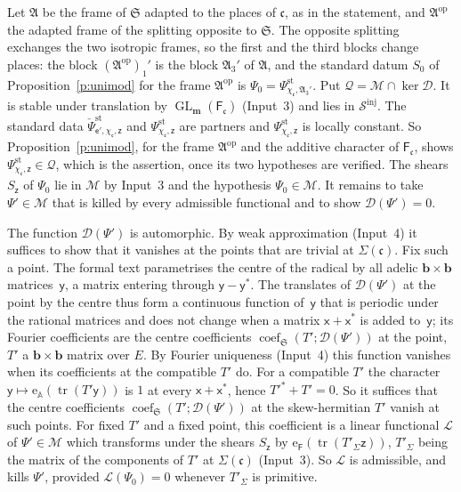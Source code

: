 \documentclass[11pt,a4paper]{article}
\makeatletter
\theoremstyle{plainx}
\theoremstyle{uprightx}
\renewenvironment{proof}[1][Proof]{\par\pushQED{\qed}\normalfont\topsep0pt\partopsep0pt
  \trivlist\item[\hskip\labelsep\itshape #1.]\ignorespaces}{\popQED\endtrivlist\@endpefalse}
\newcommand{\dL}{\check{\Psi}}         %
\newcommand{\dS}{\Psi}                 %
\newcommand{\sF}{\mathsf{F}}
\newcommand{\bb}{\mathbf{b}}
\newcommand{\bm}{\mathbf{m}}
\newcommand{\se}{\mathsf{e}}
\newcommand{\sx}{\mathsf{x}}
\newcommand{\sy}{\mathsf{y}}
\newcommand{\sz}{\mathsf{z}}
\newcommand{\fc}{\mathfrak{c}}
\newcommand{\fS}{\mathfrak{S}}
\newcommand{\fA}{\mathfrak{A}}
\newcommand{\A}{\mathbb{A}}
\newcommand{\GL}{\operatorname{GL}}
\newcommand{\tr}{\operatorname{tr}}
\newcommand{\cS}{\mathcal{S}}
\newcommand{\cM}{\mathcal{M}}
\newcommand{\cD}{\mathcal{D}}
\newcommand{\cL}{\mathcal{L}}
\newcommand{\cP}{\mathcal{Q}}
\newcommand{\stc}[2]{\dS^{\mathrm{st}}_{#1,#2}}
\newcommand{\str}[3]{\dL^{\mathrm{st}}_{#1,#2,#3}}
\newcommand{\cf}[3]{\operatorname{coef}_{#1}(#2;#3)}
\makeatother
\begin{document}
\begin{proof}[Proof of Theorem 2]
Let $\fA$ be the frame of $\fS$ adapted to the places of $\fc$, as in the statement, and $\fA^{\mathrm{op}}$ the
adapted frame of the splitting opposite to $\fS$. The opposite splitting exchanges the two isotropic frames, so
the first and the third blocks change places: the block $(\fA^{\mathrm{op}})_1'$ is the block $\fA_3'$ of $\fA$, and
the standard datum $S_0$ of Proposition~\ref{p:unimod} for the frame $\fA^{\mathrm{op}}$ is
$\dS_0=\stc{\chi_{\fc}}{\fA_3'}$. Put $\cP=\cM\cap\ker\cD$. It is stable under translation by
$\GL_{\bm}(\sF_{\fc})$ (Input~3) and lies in $\cS^{\mathrm{inj}}$. The standard data $\str{\se'}{\chi_{\fc}}{\sz}$
and $\stc{\chi_{\fc}}{\sz}$ are partners and $\stc{\chi_{\fc}}{\sz}$ is locally constant. So
Proposition~\ref{p:unimod}, for the frame $\fA^{\mathrm{op}}$ and the additive character of $\sF_{\fc}$, shows
$\stc{\chi_{\fc}}{\sz}\in\cP$, which is the assertion, once its two hypotheses are verified. The shears $S_{\sz}$ of
$\dS_0$ lie in $\cM$ by Input~3 and the hypothesis $\dS_0\in\cM$. It remains to take $\dS'\in\cM$ that is killed by
every admissible functional and to show $\cD(\dS')=0$.

The function $\cD(\dS')$ is automorphic. By weak approximation (Input~4) it suffices to show that
it vanishes at the points that are trivial at $\Sigma(\fc)$. Fix such a point. The formal text parametrises
the centre of the radical by all adelic $\bb\times\bb$ matrices~$\sy$, a matrix entering through
$\sy-\sy^{*}$. The translates of $\cD(\dS')$ at the point by the centre thus form a continuous function of~$\sy$
that is periodic under the rational matrices and does not change when a matrix $\sx+\sx^{*}$ is added to~$\sy$;
its Fourier coefficients are the centre coefficients $\cf{\fS}{T'}{\cD(\dS')}$ at the point, $T'$ a
$\bb\times\bb$ matrix over $E$. By Fourier uniqueness (Input~4) this function vanishes when its coefficients at
the compatible $T'$ do. For a compatible $T'$ the character
$\sy\mapsto\mathrm{e}_{\A}(\tr(T'\sy))$ is $1$ at every $\sx+\sx^{*}$, hence $T'^{*}+T'=0$. So it suffices that
the centre coefficients $\cf{\fS}{T'}{\cD(\dS')}$ at the skew-hermitian $T'$ vanish at such
points. For fixed $T'$ and a fixed point, this coefficient is a linear functional $\cL$ of $\dS'\in\cM$ which
transforms under the shears $S_{\sz}$ by $\mathrm{e}_{\sF}(\tr(T'_{\Sigma}\sz))$, $T'_\Sigma$ being the matrix of the
components of $T'$ at $\Sigma(\fc)$ (Input~3). So $\cL$ is admissible, and kills $\dS'$, provided
$\cL(\dS_0)=0$ whenever $T'_{\Sigma}$ is primitive.


\end{proof}
\end{document}
